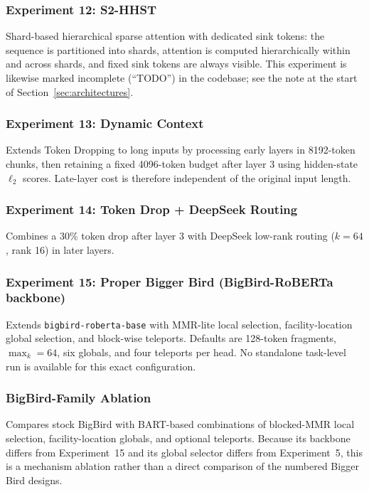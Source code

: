 \documentclass[11pt]{article}
\begin{document}
\subsubsection*{Experiment 12: S2-HHST}
\label{exp:s2hhst}
Shard-based hierarchical sparse attention with dedicated sink tokens: the
sequence is partitioned into shards, attention is computed hierarchically
within and across shards, and fixed sink tokens are always visible. This
experiment is likewise marked incomplete (``TODO'') in the codebase; see the
note at the start of Section~\ref{sec:architectures}.

\subsubsection*{Experiment 13: Dynamic Context}
\label{exp:dynamic-context}
Extends Token Dropping to long inputs by processing early layers in 8192-token
chunks, then retaining a fixed 4096-token budget after layer 3 using
hidden-state $\ell_2$ scores. Late-layer cost is therefore independent of the
original input length.

\subsubsection*{Experiment 14: Token Drop + DeepSeek Routing}
\label{exp:token-drop-deepseek}
Combines a 30\% token drop after layer 3 with DeepSeek low-rank routing
($k=64$, rank 16) in later layers.

\subsubsection*{Experiment 15: Proper Bigger Bird (BigBird-RoBERTa backbone)}
\label{exp:proper-bb}
Extends \texttt{bigbird-roberta-base} with MMR-lite local selection,
facility-location global selection, and block-wise teleports. Defaults are
128-token fragments, $\max_k=64$, six globals, and four teleports per head.
No standalone task-level run is available for this exact configuration.

\subsubsection*{BigBird-Family Ablation}
\label{exp:bigbird-family}
Compares stock BigBird with BART-based combinations of blocked-MMR local
selection, facility-location globals, and optional teleports. Because its
backbone differs from Experiment~15 and its global selector differs from
Experiment~5, this is a mechanism ablation rather than a direct comparison of
the numbered Bigger Bird designs.
\end{document}
